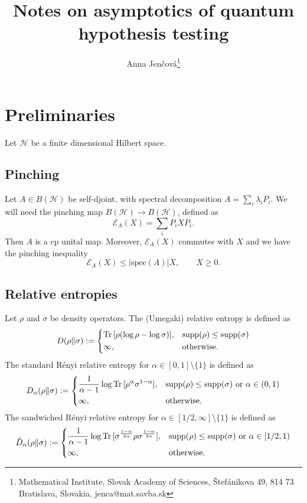 \documentclass[12pt]{article}
\title{Notes on asymptotics of quantum hypothesis testing}
\author{Anna Jen\v cov\'a\footnote{Mathematical Institute, Slovak Academy of Sciences, \v
Stef\'anikova 49, 814 73 Bratislava, Slovakia, jenca@mat.savba.sk}}
\date{}
\theoremstyle{definition}
\theoremstyle{remark}
\def\Ha{\mathcal H}
\def\Ee{\mathcal E}
\def \Tr{\mathrm{Tr}\,}
\def\supp{\mathrm{supp}}
\def\spec{\mathrm{spec}}
\begin{document}
\maketitle


\section{Preliminaries}

Let $\Ha$ be a finite dimensional Hilbert space.

\subsection{Pinching}

Let $A\in B(\Ha)$ be self-djoint, with spectral decomposition  $A=\sum_i \lambda_i P_i$.
We will need the pinching map $B(\Ha)\to B(\Ha)$, defined as 
\[
\Ee_A(X)=\sum_i P_iXP_i.
\]
Then $A$ is a cp unital map. Moreover, $\Ee_A(X)$ commutes with $X$ and we have the
pinching inequality \cite{hayashi...optimal}
\begin{equation}\label{eq:pinching}
\Ee_A(X)\le |\spec(A)|X,\qquad X\ge 0.
\end{equation}


\subsection{Relative entropies}

Let $\rho$ and $\sigma$ be density operators. 
The (Umegaki) relative entropy is defined as 
\[
D(\rho\|\sigma):=\begin{dcases} \Tr[\rho(\log \rho-\log\sigma)], &
\supp(\rho)\le\supp(\sigma)\\
\infty, & \mathrm{otherwise}.
\end{dcases}
\]
The standard R\'enyi relative entropy for $\alpha\in [0,1]\setminus\{1\}$ is defined as
\[
D_\alpha(\rho\|\sigma):=\begin{dcases}
\frac1{\alpha-1}\log\Tr[\rho^\alpha\sigma^{1-\alpha}],& \supp(\rho)\le \supp(\sigma)
\text{ or } \alpha\in (0,1)\\
\infty,& \text{otherwise}.
\end{dcases}
\]
The sandwiched R\'enyi relative entropy for $\alpha\in [1/2,\infty]\setminus\{1\}$ is
defined as
\[
\hat D_\alpha(\rho\|\sigma):=\begin{dcases}
\frac1{\alpha-1}\log\Tr[\sigma^{\frac{1-\alpha}{2\alpha}}\rho\sigma^{\frac{1-\alpha}{2\alpha}}],& \supp(\rho)\le \supp(\sigma)
\text{ or } \alpha\in [1/2,1)\\
\infty,& \text{otherwise}.
\end{dcases}
\]
\end{document}
